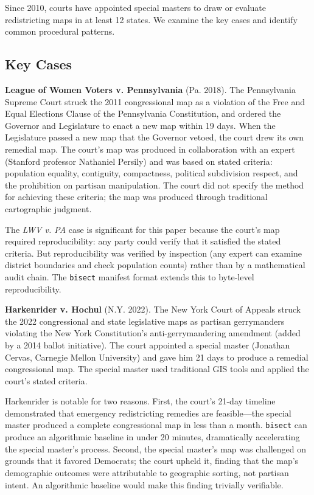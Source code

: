 Since 2010, courts have appointed special masters to draw or evaluate redistricting maps in at least 12 states. We examine the key cases and identify common procedural patterns.

\subsection{Key Cases}

\textbf{League of Women Voters v. Pennsylvania} (Pa. 2018). The Pennsylvania Supreme Court struck the 2011 congressional map as a violation of the Free and Equal Elections Clause of the Pennsylvania Constitution, and ordered the Governor and Legislature to enact a new map within 19 days. When the Legislature passed a new map that the Governor vetoed, the court drew its own remedial map. The court's map was produced in collaboration with an expert (Stanford professor Nathaniel Persily) and was based on stated criteria: population equality, contiguity, compactness, political subdivision respect, and the prohibition on partisan manipulation. The court did not specify the method for achieving these criteria; the map was produced through traditional cartographic judgment.

The \textit{LWV v. PA} case is significant for this paper because the court's map required reproducibility: any party could verify that it satisfied the stated criteria. But reproducibility was verified by inspection (any expert can examine district boundaries and check population counts) rather than by a mathematical audit chain. The \texttt{bisect} manifest format extends this to byte-level reproducibility.

\textbf{Harkenrider v. Hochul} (N.Y. 2022). The New York Court of Appeals struck the 2022 congressional and state legislative maps as partisan gerrymanders violating the New York Constitution's anti-gerrymandering amendment (added by a 2014 ballot initiative). The court appointed a special master (Jonathan Cervas, Carnegie Mellon University) and gave him 21 days to produce a remedial congressional map. The special master used traditional GIS tools and applied the court's stated criteria.

Harkenrider is notable for two reasons. First, the court's 21-day timeline demonstrated that emergency redistricting remedies are feasible---the special master produced a complete congressional map in less than a month. \texttt{bisect} can produce an algorithmic baseline in under 20 minutes, dramatically accelerating the special master's process. Second, the special master's map was challenged on grounds that it favored Democrats; the court upheld it, finding that the map's demographic outcomes were attributable to geographic sorting, not partisan intent. An algorithmic baseline would make this finding trivially verifiable.

